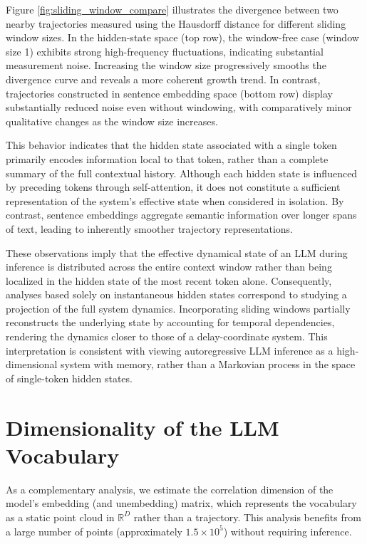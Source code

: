 \documentclass[aip%
 aip,
 amsmath,amssymb,
 reprint,%
]{revtex4-1}
\begin{document}
Figure \ref{fig:sliding_window_compare} illustrates the divergence between two nearby trajectories measured using the Hausdorff distance for different sliding window sizes. In the hidden-state space (top row), the window-free case (window size 1) exhibits strong high-frequency fluctuations, indicating substantial measurement noise. Increasing the window size progressively smooths the divergence curve and reveals a more coherent growth trend. In contrast, trajectories constructed in sentence embedding space (bottom row) display substantially reduced noise even without windowing, with comparatively minor qualitative changes as the window size increases.

This behavior indicates that the hidden state associated with a single token primarily encodes information local to that token, rather than a complete summary of the full contextual history. Although each hidden state is influenced by preceding tokens through self-attention, it does not constitute a sufficient representation of the system’s effective state when considered in isolation. By contrast, sentence embeddings aggregate semantic information over longer spans of text, leading to inherently smoother trajectory representations.

These observations imply that the effective dynamical state of an LLM during inference is distributed across the entire context window rather than being localized in the hidden state of the most recent token alone. Consequently, analyses based solely on instantaneous hidden states correspond to studying a projection of the full system dynamics. Incorporating sliding windows partially reconstructs the underlying state by accounting for temporal dependencies, rendering the dynamics closer to those of a delay-coordinate system. This interpretation is consistent with viewing autoregressive LLM inference as a high-dimensional system with memory, rather than a Markovian process in the space of single-token hidden states.

\section{Dimensionality of the LLM Vocabulary}
\label{sec:appendix_vocab_dim}

As a complementary analysis, we estimate the correlation dimension of the model’s embedding (and unembedding) matrix, which represents the vocabulary as a static point cloud in $\mathbb{R}^D$ rather than a trajectory. This analysis benefits from a large number of points (approximately $1.5\times10^5$) without requiring inference.
\end{document}
